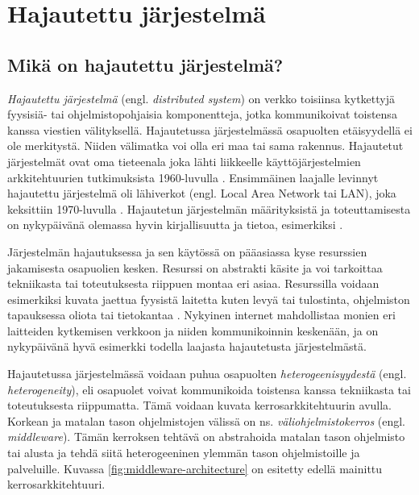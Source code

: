 \chapter{Hajautettu järjestelmä}
\label{ch:distributed-systems}


\section{Mikä on hajautettu järjestelmä?}
\emph{Hajautettu järjestelmä} (engl. \emph{distributed system}) on verkko toisiinsa kytkettyjä fyysisiä- tai ohjelmistopohjaisia komponentteja, jotka kommunikoivat toistensa kanssa viestien välityksellä. Hajautetussa järjestelmässä osapuolten etäisyydellä ei ole merkitystä. Niiden välimatka voi olla eri maa tai sama rakennus. Hajautetut järjestelmät ovat oma tieteenala joka lähti liikkeelle käyttöjärjestelmien arkkitehtuurien tutkimuksista 1960-luvulla \cite[s.~384]{andrews2000foundations}. Ensimmäinen laajalle levinnyt hajautettu järjestelmä oli lähiverkot (engl. Local Area Network tai LAN), joka keksittiin 1970-luvulla \cite[s.~32]{andrews2000foundations}. Hajautetun järjestelmän määrityksistä ja toteuttamisesta on nykypäivänä olemassa hyvin kirjallisuutta ja tietoa, esimerkiksi \cite{distributed-systems-concepts-and-design, distributed-event-based-systems, mullender1993distributed, baldoni2005distributed}.

Järjestelmän hajautuksessa ja sen käytössä on pääasiassa kyse resurssien jakamisesta osapuolien kesken. Resurssi on abstrakti käsite ja voi tarkoittaa tekniikasta tai toteutuksesta riippuen montaa eri asiaa. Resurssilla voidaan esimerkiksi kuvata jaettua fyysistä laitetta kuten levyä tai tulostinta, ohjelmiston tapauksessa oliota tai tietokantaa \cite[s.~2--3]{distributed-systems-concepts-and-design}. Nykyinen internet mahdollistaa monien eri laitteiden kytkemisen verkkoon ja niiden kommunikoinnin keskenään, ja on nykypäivänä hyvä esimerkki todella laajasta hajautetusta järjestelmästä.

Hajautetussa järjestelmässä voidaan puhua osapuolten \emph{heterogeenisyydestä} (engl. \emph{heterogeneity}), eli osapuolet voivat kommunikoida toistensa kanssa tekniikasta tai toteutuksesta riippumatta. Tämä voidaan kuvata kerrosarkkitehtuurin avulla. Korkean ja matalan tason ohjelmistojen välissä on ns. \emph{väliohjelmistokerros} (engl. \emph{middleware}). Tämän kerroksen tehtävä on abstrahoida matalan tason ohjelmisto tai alusta ja tehdä siitä heterogeeninen ylemmän tason ohjelmistoille ja palveluille. Kuvassa \ref{fig:middleware-architecture} on esitetty edellä mainittu kerrosarkkitehtuuri. \mbox{\cite[s. ~16--17]{distributed-systems-concepts-and-design}} \mbox{\cite[s.~2--3]{distributed-event-based-systems}}

